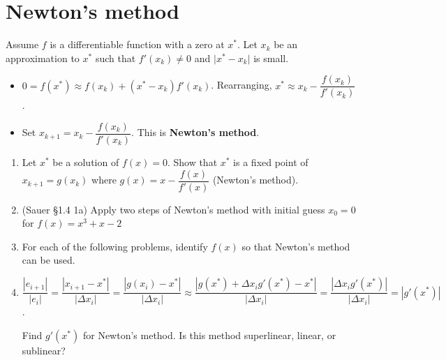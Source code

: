 \documentclass[12pt,letterpaper,noanswers]{exam}
\begin{document}
\section*{Newton's method}
\begin{tcolorbox}
Assume $f$ is a differentiable function with a zero at $x^*$.  Let $x_k$ be an approximation to $x^*$ such that $f'(x_k)\neq 0$ and $\vert x^*-x_k\vert$ is small.
\begin{itemize}
\itemsep0pt
    \item $ 0 = f(x^*) \approx f(x_k) + (x^*-x_k)f'(x_k)$.  Rearranging, $x^* \approx x_k - \dfrac{f(x_k)}{f'(x_k)}$.
    \item Set $x_{k+1} = x_k - \dfrac{f(x_k)}{f'(x_k)}$.  This is \textbf{Newton's method}.

\end{itemize}
\end{tcolorbox}
\begin{enumerate}
\item Let $x^*$ be a solution of $f(x) = 0$.  Show that $x^*$ is a fixed point of $x_{k+1} = g(x_k)$ where $g(x) = x - \dfrac{f(x)}{f'(x)}$ (Newton's method).
\vspace{1in}
    \item (Sauer \S1.4 1a) Apply two steps of Newton's method with initial guess $x_0 = 0$ for $f(x) = x^3+x-2$
    \vspace{1in}

        \item For each of the following problems, identify $f(x)$ so that Newton's method can be used.
\vspace{1in}

\item $\dfrac{\left\vert e_{i+1} \right\vert}{\left\vert e_{i} \right\vert} = \dfrac{\left\vert x_{i+1}-x^*\right\vert}{\left\vert \Delta x_i \right\vert} = \dfrac{\left\vert g(x_{i}) -x^*\right\vert}{\left\vert \Delta x_i \right\vert} \approx \dfrac{\left\vert g(x^*) + \Delta x_i g'(x^*) -x^*\right\vert}{\left\vert \Delta x_i \right\vert} = \dfrac{\left\vert  \Delta x_i g'(x^*) \right\vert}{\left\vert \Delta x_i \right\vert} = \left\vert g'(x^*) \right\vert$.

    Find $g'(x^*)$ for Newton's method.  Is this method superlinear, linear, or sublinear?
    \end{enumerate}
    \vspace{1in}
\end{document}
